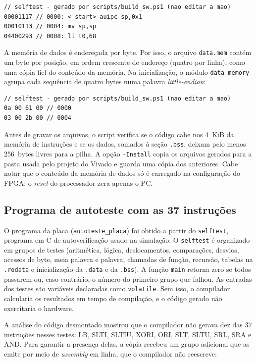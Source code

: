 \begin{lstlisting}
// selftest - gerado por scripts/build_sw.ps1 (nao editar a mao)
00001117 // 0000: <_start> auipc sp,0x1
00010113 // 0004: mv sp,sp
04400293 // 0008: li t0,68
\end{lstlisting}

A memória de dados é endereçada por byte. Por isso, o arquivo
\texttt{data.mem} contém um byte por posição, em ordem crescente de endereço
(quatro por linha), como uma cópia fiel do conteúdo da memória. Na
inicialização, o módulo \texttt{data\_memory} agrupa cada sequência de
quatro bytes numa palavra \textit{little-endian}:

\begin{lstlisting}
// selftest - gerado por scripts/build_sw.ps1 (nao editar a mao)
0a 00 61 00 // 0000
03 00 2b 00 // 0004
\end{lstlisting}

Antes de gravar os arquivos, o script verifica se o código cabe nos 4~KiB da
memória de instruções e se os dados, somados à seção \texttt{.bss}, deixam
pelo menos 256~bytes livres para a pilha. A opção \texttt{-Install} copia os
arquivos gerados para a pasta usada pelo projeto do Vivado e guarda uma
cópia dos anteriores. Cabe notar que o conteúdo da memória de dados só é
carregado na configuração do FPGA: o \textit{reset} do processador zera
apenas o PC.

\subsection{Programa de autoteste com as 37 instruções}

O programa da placa (\texttt{autoteste\_placa}) foi obtido a partir do
\texttt{selftest}, programa em C de autoverificação usado na simulação. O
\texttt{selftest} é organizado em grupos de testes (aritmética, lógica,
deslocamentos, comparações, desvios, acessos de byte, meia palavra e
palavra, chamadas de função, recursão, tabelas na \texttt{.rodata} e
inicialização da \texttt{.data} e da \texttt{.bss}). A função \texttt{main}
retorna zero se todos passarem ou, caso contrário, o número do primeiro
grupo que falhou. As entradas dos testes são variáveis declaradas como
\texttt{volatile}. Sem isso, o compilador calcularia os resultados em tempo
de compilação, e o código gerado não exercitaria o hardware.

A análise do código desmontado mostrou que o compilador não gerava dez das
37 instruções nesses testes: LB, SLTI, SLTIU, XORI, ORI, SLT, SLTU, SRL, SRA
e AND. Para garantir a presença delas, a cópia recebeu um grupo adicional
que as emite por meio de \textit{assembly} em linha, que o compilador não
reescreve:

